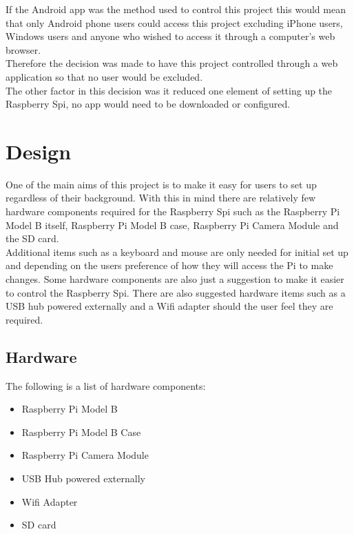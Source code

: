 \documentclass[12pt]{report}
\begin{document}
If the Android app was the method used to control this project this would mean that only Android phone users could access this project excluding iPhone users, Windows users and anyone who wished to access it through a computer's web browser.\\

Therefore the decision was made to have this project controlled through a web application so that no user would be excluded.\\ 

The other factor in this decision was it reduced one element of setting up the Raspberry Spi, no app would need to be downloaded or configured.\\

% 
\chapter{Design}
\label{ch:design}
	One of the main aims of this project is to make it easy for users to set up regardless of their background. With this in mind there are relatively few hardware components required for the Raspberry Spi such as the Raspberry Pi Model B itself, Raspberry Pi Model B case, Raspberry Pi Camera Module and the SD card.\\
	 
Additional items such as a keyboard and mouse are only needed for initial set up and depending on the users preference of how they will access the Pi to make changes. Some hardware components are also just a suggestion to make it easier to control the Raspberry Spi. 
There are also suggested hardware items such as a USB hub powered externally and a Wifi adapter should the user feel they are required.\\
	
\section{Hardware}	
\label{sec:hardware}

The following is a list of hardware components:\\
\begin{itemize}
  \item Raspberry Pi Model B\\
  \item Raspberry Pi Model B Case\\
  \item Raspberry Pi Camera Module\\
  \item USB Hub powered externally\\
  \item Wifi Adapter\\
  \item SD card\\
\end{itemize} 
\end{document}
